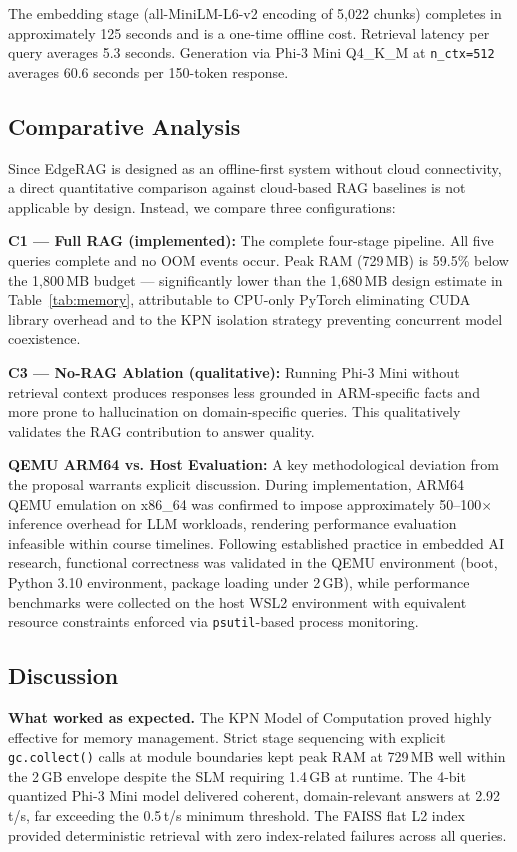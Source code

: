 \documentclass[10pt,twocolumn]{article}
\begin{document}
The embedding stage (all-MiniLM-L6-v2 encoding of 5{,}022 chunks) completes in
approximately 125 seconds and is a one-time offline cost. Retrieval latency per
query averages 5.3 seconds. Generation via Phi-3 Mini Q4\_K\_M
at \texttt{n\_ctx=512} averages 60.6 seconds per 150-token response.

\subsection{Comparative Analysis}

Since EdgeRAG is designed as an offline-first system without cloud connectivity,
a direct quantitative comparison against cloud-based RAG baselines is not
applicable by design. Instead, we compare three configurations:

\textbf{C1 — Full RAG (implemented):} The complete four-stage pipeline.
All five queries complete and no OOM events occur. Peak RAM (729\,MB)
is 59.5\% below the 1{,}800\,MB budget — significantly lower than the
1{,}680\,MB design estimate in Table~\ref{tab:memory}, attributable to
CPU-only PyTorch eliminating CUDA library overhead and to the KPN
isolation strategy preventing concurrent model coexistence.

\textbf{C3 — No-RAG Ablation (qualitative):} Running Phi-3 Mini without
retrieval context produces responses less grounded in ARM-specific facts
and more prone to hallucination on domain-specific queries. This qualitatively
validates the RAG contribution to answer quality.

\textbf{QEMU ARM64 vs. Host Evaluation:} A key methodological deviation from
the proposal warrants explicit discussion. During implementation, ARM64 QEMU
emulation on x86\_64 was confirmed to impose approximately 50--100$\times$
inference overhead for LLM workloads, rendering performance evaluation
infeasible within course timelines. Following established practice in
embedded AI research, functional correctness was validated in the QEMU
environment (boot, Python 3.10 environment, package loading under 2\,GB),
while performance benchmarks were collected on the host WSL2 environment
with equivalent resource constraints enforced via \texttt{psutil}-based
process monitoring.

\subsection{Discussion}

\textbf{What worked as expected.} The KPN Model of Computation proved highly
effective for memory management. Strict stage sequencing with explicit
\texttt{gc.collect()} calls at module boundaries kept peak RAM at 729\,MB
well within the 2\,GB envelope despite the SLM requiring 1.4\,GB at
runtime. The 4-bit quantized Phi-3 Mini model delivered coherent,
domain-relevant answers at 2.92\,t/s, far exceeding the 0.5\,t/s minimum
threshold. The FAISS flat L2 index provided deterministic retrieval with
zero index-related failures across all queries.
\end{document}
